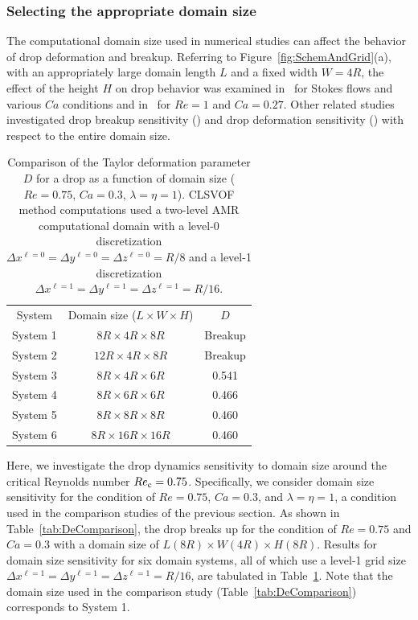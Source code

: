 \documentclass{elsarticle}
\newcommand{\LWH}{L\times W \times H}
\newcommand{\lwh}[3]{L(#1R)\times W(#2R) \times H(#3R)}
\begin{document}
\subsubsection{Selecting the appropriate domain size}

The computational domain size used in numerical studies can affect the behavior of drop deformation and breakup.  Referring to Figure~\ref{fig:SchemAndGrid}(a), with an appropriately large domain length $L$ and a fixed width $W=4R$, the effect of the height $H$ on drop behavior was examined in~\citet{LiRenRen00} for Stokes flows and various $Ca$ conditions and in~\citet{KomShaEskDer14} for $Re=1$ and $Ca=0.27$.  Other related studies investigated drop breakup sensitivity (\citet{RenCri01-1}) and drop deformation sensitivity (\citet{RenCriLi02}) with respect to the entire domain size.  
%
\begin{table}[tbh]
\caption{Comparison of the Taylor deformation parameter $D$ for a drop as a function of
         domain size ($Re=0.75$, $Ca=0.3$, $\lambda = \eta = 1$).
         CLSVOF method computations used a two-level AMR computational domain 
         with a level-0 discretization $\Delta x^{\ell=0} = \Delta y^{\ell=0} 
         = \Delta z^{\ell=0} = R/8$ and a level-1 discretization
         $\Delta x^{\ell=1} = \Delta y^{\ell=1} = \Delta z^{\ell=1} = R/16$.}
\label{tab:DomComparison}
\center
\begin{tabular}{ c  c  c}
\hline
\hline
System      & Domain size ($\LWH$)         & $D$     \\
System 1    & $8R  \times 4R  \times 8R$   & Breakup \\
System 2    & $12R \times 4R  \times 8R$   & Breakup \\
System 3    & $8R  \times 4R  \times 6R$   & 0.541   \\
System 4    & $8R  \times 6R  \times 6R$   & 0.466   \\
System 5    & $8R  \times 8R  \times 8R$   & 0.460   \\
System 6    & $8R  \times 16R \times 16R$  & 0.460   \\
\hline
\hline
\end{tabular}
\end{table}
%
Here, we investigate the drop dynamics sensitivity to domain size around the critical Reynolds number $Re_{\rm c}=0.75$.  Specifically, we consider domain size sensitivity for the condition of $Re=0.75$, $Ca=0.3$, and $\lambda = \eta = 1$, a condition used in the comparison studies of the previous section.  As shown in Table~\ref{tab:DeComparison}, the drop breaks up for the condition of $Re=0.75$ and $Ca=0.3$ with a domain size of $\lwh{8}{4}{8}$.  Results for domain size sensitivity for six domain systems, all of which use a level-1 grid size $\Delta x^{\ell=1} = \Delta y^{\ell=1}= \Delta z^{\ell=1} = R/16$, are tabulated in Table~\ref{tab:DomComparison}. Note that the domain size used in the comparison study (Table~\ref{tab:DeComparison}) corresponds to System 1.
\end{document}
